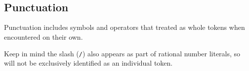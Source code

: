 \begin{bnf*}
     \\
     \\
     \\
     \\
     \\
     \\
     \\
\end{bnf*}

\subsection{Punctuation}

Punctuation includes symbols and operators that treated as whole tokens when encountered
on their own.

Keep in mind the slash (\texttt{/}) also appears as part of rational number literals, so
will not be exclusively identified as an individual token.

